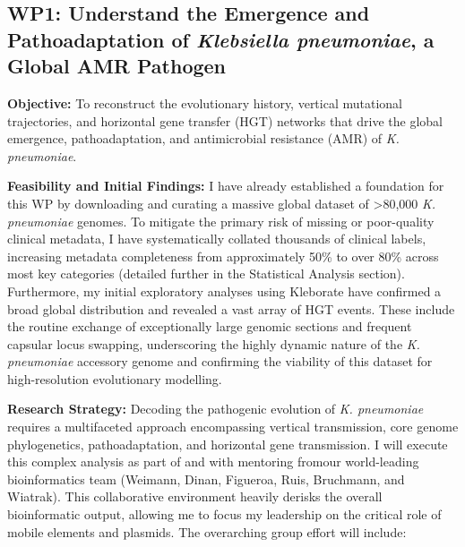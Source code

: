 \documentclass{article}
\begin{document}
\subsection{WP1: Understand the Emergence and Pathoadaptation of \textit{Klebsiella pneumoniae}, a Global AMR Pathogen}


\textbf{Objective:} To reconstruct the evolutionary history, vertical mutational trajectories, and horizontal gene transfer (HGT) networks that drive the global emergence, pathoadaptation, and antimicrobial resistance (AMR) of \textit{K. pneumoniae}. 

\textbf{Feasibility and Initial Findings:} 
I have already established a foundation for this WP by downloading and curating a massive global dataset of >80,000 \textit{K. pneumoniae} genomes. To mitigate the primary risk of missing or poor-quality clinical metadata, I have systematically collated thousands of clinical labels, increasing metadata completeness from approximately 50\% to over 80\% across most key categories (detailed further in the Statistical Analysis section). Furthermore, my initial exploratory analyses using Kleborate have confirmed a broad global distribution and revealed a vast array of HGT events. These include the routine exchange of exceptionally large genomic sections and frequent capsular locus swapping, underscoring the highly dynamic nature of the \textit{K. pneumoniae} accessory genome and confirming the viability of this dataset for high-resolution evolutionary modelling.

\textbf{Research Strategy:}
Decoding the pathogenic evolution of \textit{K. pneumoniae} requires a multifaceted approach encompassing vertical transmission, core genome phylogenetics, pathoadaptation, and horizontal gene transmission. I will execute this complex analysis as part of and with mentoring fromour world-leading bioinformatics team (Weimann, Dinan, Figueroa, Ruis, Bruchmann, and Wiatrak). This collaborative environment heavily derisks the overall bioinformatic output, allowing me to focus my leadership on the critical role of mobile elements and plasmids. The overarching group effort will include:
\end{document}
